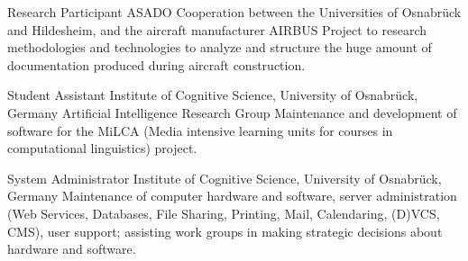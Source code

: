         {Research Participant}
        {ASADO}
        {Cooperation between the Universities of Osnabr\"{u}ck and Hildesheim,
        and the aircraft manufacturer AIRBUS}
        {}
        {Project to research methodologies and
        technologies to analyze and structure the huge amount of documentation
        produced during aircraft construction.}

        {Student Assistant}
        {Institute of Cognitive Science, University of Osnabr\"{u}ck, Germany}
        {Artificial Intelligence Research Group}
        {}
        {Maintenance and development of software for the MiLCA (Media intensive
        learning units for courses in computational linguistics) project.}

        {System Administrator}
        {Institute of Cognitive Science, University of Osnabr\"{u}ck, Germany}
        {}
        {}
        {Maintenance of computer hardware and software, server administration
        (Web Services, Databases, File Sharing, Printing, Mail, Calendaring,
        (D)VCS, CMS), user support; assisting work groups in making strategic
        decisions about hardware and software.}


